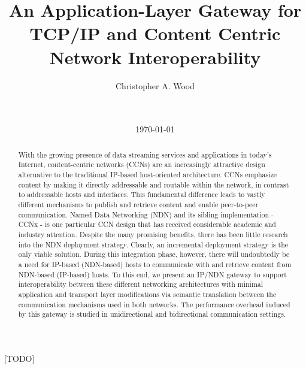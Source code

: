 \documentclass{sigcomm}
\begin{document}
\title{An Application-Layer Gateway for TCP/IP and Content Centric Network Interoperability}

\author{
\alignauthor
Christopher A. Wood\\
       \\
       \\
}

\date{\today}

\maketitle
\begin{abstract}
With the growing presence of data streaming services and applications in today's Internet, content-centric networks (CCNs) are an increasingly attractive design alternative to the traditional IP-based host-oriented architecture. CCNs emphasize content by making it directly addressable and routable within the network, in contrast to addressable hosts and interfaces. This fundamental difference leads to vastly different mechanisms to publish and retrieve content and enable peer-to-peer communication. Named Data Networking (NDN) and its sibling implementation - CCNx - is one particular CCN design that has received considerable academic and industry attention. Despite the many promising benefits, there has been little research into the NDN deployment strategy. Clearly, an incremental deployment strategy is the only viable solution. During this integration phase, however, there will undoubtedly be a need for IP-based (NDN-based) hosts to communicate with and retrieve content from NDN-based (IP-based) hosts. To this end, we present an IP/NDN gateway to support interoperability between these different networking architectures with minimal application and transport layer modifications via semantic translation between the communication mechanisms used in both networks. The performance overhead induced by this gateway is studied in unidirectional and bidirectional communication settings.
\end{abstract}

[TODO]







% 
% 
% 




\end{document}
